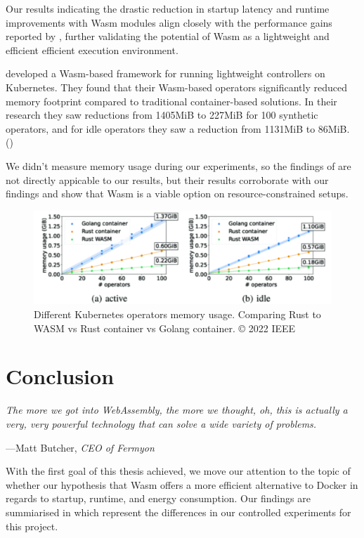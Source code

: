 \documentclass[
  table]{report}
\begin{document}
Our results indicating the drastic reduction in startup latency and
runtime improvements with \ac{Wasm} modules align closely with the
performance gains reported by
\citet{shillakerFaasmLightweightIsolation2020a}, further validating the
potential of \ac{Wasm} as a lightweight and efficient efficient
execution environment.

\citet{sebrechtsAdaptingKubernetesControllers2022} developed a
\ac{Wasm}-based framework for running lightweight controllers on
Kubernetes. They found that their \ac{Wasm}-based operators
significantly reduced memory footprint compared to traditional
container-based solutions. In their research they saw reductions from
1405MiB to 227MiB for 100 synthetic operators, and for idle operators
they saw a reduction from 1131MiB to 86MiB. ()

We didn't measure memory usage during our experiments, so the findings
of \citet{sebrechtsAdaptingKubernetesControllers2022} are not directly
appicable to our results, but their results corroborate with our
findings and show that \ac{Wasm} is a viable option on
resource-constrained setups.

\begin{figure}[H]
\centering
  \includegraphics{assets/3.8-memoryusage-wasm.png}
  \caption{Different Kubernetes operators memory usage. Comparing Rust to WASM
vs Rust container vs Golang container. © 2022 IEEE}
  \label{fig:wasm-memory}
\end{figure}

\newpage
\chapter{Conclusion}

\epigraph{\itshape  
The more we got into WebAssembly, the more we thought, oh, this is actually a very, very powerful technology that can solve a wide variety of problems.
}{---Matt Butcher, \textit{CEO of Fermyon}}

With the first goal of this thesis achieved, we move our attention to
the topic of whether our hypothesis that Wasm offers a more efficient
alternative to Docker in regards to startup, runtime, and energy
consumption. Our findings are summiarised in
 which represent the differences in our
controlled experiments for this project.
\end{document}
